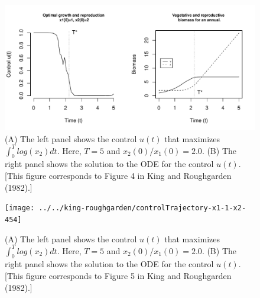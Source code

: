 \documentclass[12pt, oneside]{article}   	%
\begin{document}
 \begin{figure}[h]
   \centering
       \includegraphics[page=1,width=.9\textwidth]{../../king-roughgarden/controlTrajectory-x1-1-x2-2}  
    \caption{ (A) The left panel shows the control $u(t)$ that maximizes $ \int_{0}^{T} log(x_2) dt. $ Here, $ T=5$ and $x_2(0)/x_1(0) = 2.0$. (B) The right panel shows the solution to the ODE for the control $u(t)$. [This figure corresponds to Figure 4 in King and Roughgarden (1982).] }
 \label{fig:kingRoughgardenFigure4}
\end{figure}

 \begin{figure}[h]
   \centering
       \texttt{[image: ../../king-roughgarden/controlTrajectory-x1-1-x2-454]}  
    \caption{ (A) The left panel shows the control $u(t)$ that maximizes $ \int_{0}^{T} log(x_2) dt. $ Here, $ T=5$ and $x_2(0)/x_1(0) = 2.0$. (B) The right panel shows the solution to the ODE for the control $u(t)$. [This figure corresponds to Figure 5 in King and Roughgarden (1982).] }
 \label{fig:kingRoughgardenFigure5}
\end{figure}
\end{document}
